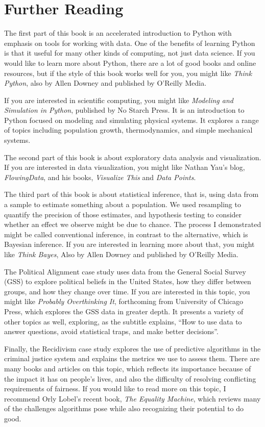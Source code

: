 \hypertarget{further-reading}{%
\chapter{Further Reading}\label{further-reading}}

The first part of this book is an accelerated introduction to Python
with emphasis on tools for working with data. One of the benefits of
learning Python is that it useful for many other kinds of computing, not
just data science. If you would like to learn more about Python, there
are a lot of good books and online resources, but if the style of this
book works well for you, you might like \emph{Think Python}, also by
Allen Downey and published by O'Reilly Media.

If you are interested in scientific computing, you might like
\emph{Modeling and Simulation in Python}, published by No Starch Press.
It is an introduction to Python focused on modeling and simulating
physical systems. It explores a range of topics including population
growth, thermodynamics, and simple mechanical systems.

The second part of this book is about exploratory data analysis and
visualization. If you are interested in data visualization, you might
like Nathan Yau's blog, \emph{FlowingData}, and his books,
\emph{Visualize This} and \emph{Data Points}.

The third part of this book is about statistical inference, that is,
using data from a sample to estimate something about a population. We
used resampling to quantify the precision of those estimates, and
hypothesis testing to consider whether an effect we observe might be due
to chance. The process I demonstrated might be called conventional
inference, in contrast to the alternative, which is Bayesian inference.
If you are interested in learning more about that, you might like
\emph{Think Bayes}, Also by Allen Downey and published by O'Reilly
Media.

The Political Alignment case study uses data from the General Social
Survey (GSS) to explore political beliefs in the United States, how they
differ between groups, and how they change over time. If you are
interested in this topic, you might like \emph{Probably Overthinking
It}, forthcoming from University of Chicago Press, which explores the
GSS data in greater depth. It presents a variety of other topics as
well, exploring, as the subtitle explains, ``How to use data to answer
questions, avoid statistical traps, and make better decisions''.

Finally, the Recidivism case study explores the use of predictive
algorithms in the criminal justice system and explains the metrics we
use to assess them. There are many books and articles on this topic,
which reflects its importance because of the impact it has on people's
lives, and also the difficulty of resolving conflicting requirements of
fairness. If you would like to read more on this topic, I recommend Orly
Lobel's recent book, \emph{The Equality Machine}, which reviews many of
the challenges algorithms pose while also recognizing their potential to
do good.



